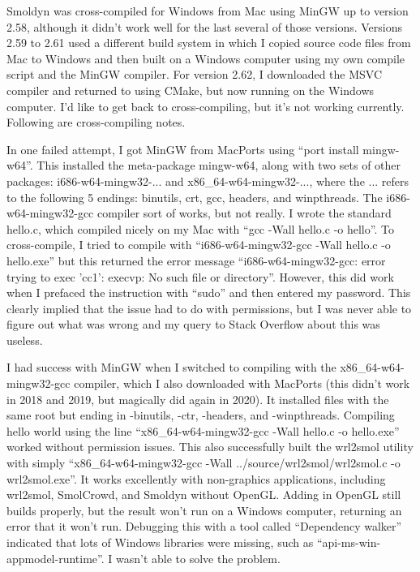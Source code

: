 \documentclass {book}
\begin{document}
Smoldyn was cross-compiled for Windows from Mac using MinGW up to version 2.58, although it didn't work well for the last several of those versions. Versions 2.59 to 2.61 used a different build system in which I copied source code files from Mac to Windows and then built on a Windows computer using my own compile script and the MinGW compiler. For version 2.62, I downloaded the MSVC compiler and returned to using CMake, but now running on the Windows computer. I'd like to get back to cross-compiling, but it's not working currently. Following are cross-compiling notes.

In one failed attempt, I got MinGW from MacPorts using ``port install mingw-w64''. This installed the meta-package mingw-w64, along with two sets of other packages: i686-w64-mingw32-... and x86\_64-w64-mingw32-..., where the ... refers to the following 5 endings: binutils, crt, gcc, headers, and winpthreads. The i686-w64-mingw32-gcc compiler sort of works, but not really. I wrote the standard hello.c, which compiled nicely on my Mac with ``gcc -Wall hello.c -o hello''. To cross-compile, I tried to compile with ``i686-w64-mingw32-gcc -Wall hello.c -o hello.exe'' but this returned the error message ``i686-w64-mingw32-gcc: error trying to exec 'cc1': execvp: No such file or directory''. However, this did work when I prefaced the instruction with ``sudo'' and then entered my password. This clearly implied that the issue had to do with permissions, but I was never able to figure out what was wrong and my query to Stack Overflow about this was useless.

I had success with MinGW when I switched to compiling with the x86\_64-w64-mingw32-gcc compiler, which I also downloaded with MacPorts (this didn't work in 2018 and 2019, but magically did again in 2020). It installed files with the same root but ending in -binutils, -ctr, -headers, and -winpthreads. Compiling hello world using the line ``x86\_64-w64-mingw32-gcc -Wall hello.c -o hello.exe'' worked without permission issues. This also successfully built the wrl2smol utility with simply ``x86\_64-w64-mingw32-gcc -Wall ../source/wrl2smol/wrl2smol.c -o wrl2smol.exe''. It works excellently with non-graphics applications, including wrl2smol, SmolCrowd, and Smoldyn without OpenGL. Adding in OpenGL still builds properly, but the result won't run on a Windows computer, returning an error that it won't run. Debugging this with a tool called ``Dependency walker'' indicated that lots of Windows libraries were missing, such as ``api-ms-win-appmodel-runtime''. I wasn't able to solve the problem.
\end{document}
